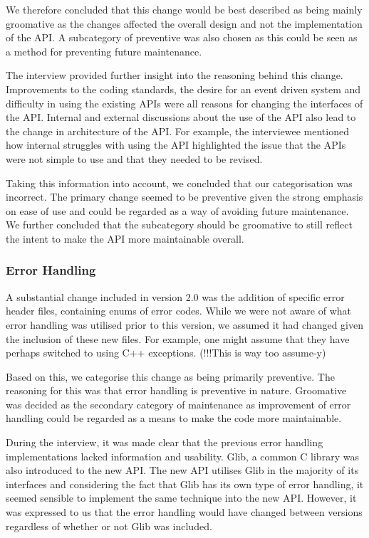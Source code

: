 \documentclass{sig-alternate}
\begin{document}
We therefore concluded that this change would be best described as being mainly groomative as the changes affected the overall design and not the implementation of the API. A subcategory of preventive was also chosen as this could be seen as a method for preventing future maintenance. 

The interview provided further insight into the reasoning behind this change. Improvements to the coding standards, the desire for an event driven system and difficulty in using the existing APIs were all reasons for changing the interfaces of the API. Internal and external discussions about the use of the API also lead to the change in architecture of the API. For example, the interviewee mentioned how internal struggles with using the API highlighted the issue that the APIs were not simple to use and that they needed to be revised.

Taking this information into account, we concluded that our categorisation was incorrect. The primary change seemed to be preventive given the strong emphasis on ease of use and could be regarded as a way of avoiding future maintenance. We further concluded that the subcategory should be groomative to still reflect the intent to make the API more maintainable overall.


\subsubsection{Error Handling}

A substantial change included in version 2.0 was the addition of specific error header files, containing enums of error codes. While we were not aware of what error handling was utilised prior to this version, we assumed it had changed given the inclusion of these new files. For example, one might assume that they have perhaps switched to using C++ exceptions. (!!!This is way too assume-y)

Based on this, we categorise this change as being primarily preventive. The reasoning for this was that error handling is preventive in nature. Groomative was decided as the secondary category of maintenance as improvement of error handling could be regarded as a means to make the code more maintainable. 

During the interview, it was made clear that the previous error handling implementations lacked information and usability. Glib, a common C library was also introduced to the new API. The new API utilises Glib in the majority of its interfaces and considering the fact that Glib has its own type of error handling, it seemed sensible to implement the same technique into the new API. However, it was expressed to us that the error handling would have changed between versions regardless of whether or not Glib was included.
\end{document}
